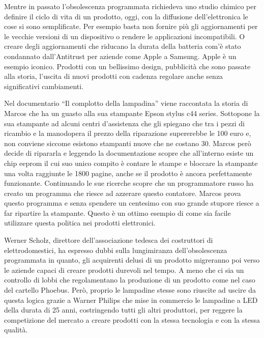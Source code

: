 \documentclass[12pt]{book} %
\begin{document}
Mentre in passato l'obsolescenza programmata richiedeva uno studio chimico per definire il ciclo di
vita di un prodotto, oggi, con la diffusione dell'elettronica le cose si sono semplificate. Per
esempio basta non fornire più gli aggiornamenti per le vecchie versioni di un dispositivo o rendere le applicazioni
incompatibili. O creare degli aggiornamenti che riducano la durata della batteria com'è stato
condannato dall'Antitrust per aziende come Apple a Samsung. Apple è un esempio iconico. Prodotti
con un bellissimo design, pubblicità che sono passate alla storia, l'uscita di nuovi prodotti con cadenza regolare anche senza significativi cambiamenti.

Nel documentario “Il complotto della lampadina” viene raccontata
la storia di Marcos che ha un guasto alla sua stampante Epson stylus c44 series. Sottopone la sua stampante ad alcuni
centri d'assistenza che gli spiegano che tra i pezzi di ricambio e la manodopera il prezzo della
riparazione supererebbe le 100 euro e, non conviene siccome esistono stampanti nuove che ne costano 30. Marcos però
decide di ripararla e leggendo la documentazione scopre che all'interno esiste un chip eeprom il
cui suo unico compito è contare le stampe e bloccare la stampante una volta raggiunte le 1800 pagine, anche se il
prodotto è ancora perfettamente funzionante. Continuando le sue ricerche scopre che un programmatore russo ha creato un
programma che riesce ad azzerare questo contatore. Marcos prova questo
programma e senza spendere un centesimo con suo grande stupore riesce a far ripartire la stampante. Questo è un ottimo
esempio di come sia facile utilizzare questa politica nei prodotti elettronici.

Werner Scholz, direttore dell'associazione tedesca dei costruttori di elettrodomestici, ha espresso dubbi sulla
lungimiranza dell'obsolescenza programmata in quanto, gli acquirenti delusi di un prodotto migreranno poi verso le
aziende capaci di creare prodotti durevoli nel tempo. A meno che ci sia un controllo di lobbi che regolamentano la
produzione di un prodotto come nel caso del cartello Phoebus. Però, proprio le lampadine stesse sono riuscite ad uscire
da questa logica grazie a Warner Philips che mise in commercio le lampadine a LED della durata di 25 anni, costringendo
tutti gli altri produttori, per reggere la competizione del mercato a creare prodotti con la stessa tecnologia e con la
stessa qualità.
\end{document}
